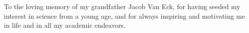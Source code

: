 
%

\begin{ntdedicatory}[10cm]

To the loving memory of my grandfather Jacob Van Eck, for having seeded my interest in science from a young age, and for always inspiring and motivating me in life and in all my academic endeavors.

\end{ntdedicatory}